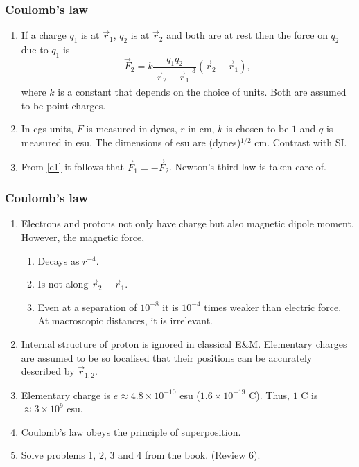 \documentclass{beamer}
\begin{document}
\begin{frame}
\frametitle{Coulomb's law}
\begin{enumerate}
\item If a charge $q_1$ is at $\vec{r}_1$, $q_2$ is at $\vec{r}_2$ and both are at rest then the force on $q_2$ due to $q_1$ is
\begin{equation}\label{e1}
\vec{F}_2 = k\frac{q_1q_2}{|\vec{r}_2 - \vec{r}_1|^3}(\vec{r}_2 - \vec{r}_1),
\end{equation}
where $k$ is a constant that depends on the choice of units. Both are assumed to be point charges.

\item In cgs units, $F$ is measured in dynes, $r$ in cm, $k$ is chosen to be $1$ and $q$ is measured in esu. The dimensions of esu
are (dynes)$^{1/2}$ cm. Contrast with SI.

\item From \eqref{e1} it follows that $\vec{F}_1 = -\vec{F}_2$. Newton's third law is taken care of.
\end{enumerate}
\end{frame}

\begin{frame}
\frametitle{Coulomb's law}
\begin{enumerate}
\item Electrons and protons not only have charge but also magnetic dipole moment. However, the magnetic force,
\begin{enumerate}
\item Decays as $r^{-4}$.
\item Is not along $\vec{r}_2 - \vec{r}_1$.
\item Even at a separation of $10^{-8}$ it is $10^{-4}$ times weaker than electric force. At macroscopic distances, it is 
irrelevant.
\end{enumerate}
\item Internal structure of proton is ignored in classical E\&M. Elementary charges are assumed to be so localised that their
positions can be accurately described by $\vec{r}_{1,2}$.
\item Elementary charge is $e \approx 4.8 \times 10^{-10}$ esu ($1.6 \times 10^{-19}$ C). Thus, $1$ C is $\approx 3 \times 
10^9$ esu.
\item Coulomb's law obeys the principle of superposition.
\item Solve problems 1, 2, 3 and 4 from the book. (Review 6).
\end{enumerate}
\end{frame}
\end{document}
